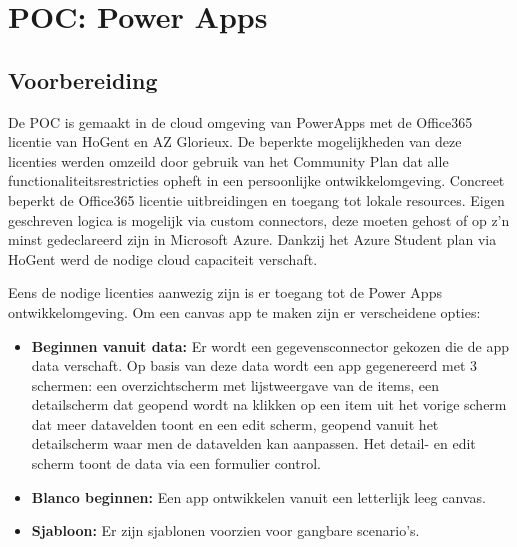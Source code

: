 
\chapter{POC: Power Apps}
\label{ch:powerapps-poc}



\section{Voorbereiding}
\label{sec:voorbereiding-pa}

De POC is gemaakt in de cloud omgeving van PowerApps met de Office365 licentie van HoGent en AZ Glorieux. De beperkte mogelijkheden van deze licenties werden omzeild door gebruik van het Community Plan dat alle functionaliteitsrestricties opheft in een persoonlijke ontwikkelomgeving. Concreet beperkt de Office365 licentie uitbreidingen en toegang tot lokale resources. Eigen geschreven logica is mogelijk via custom connectors, deze moeten gehost of op z'n minst gedeclareerd zijn in Microsoft Azure. Dankzij het Azure Student plan via HoGent werd de nodige cloud capaciteit verschaft.

Eens de nodige licenties aanwezig zijn is er toegang tot de Power Apps ontwikkelomgeving. Om een canvas app te maken zijn er verscheidene opties:
\begin{itemize}
    \item \textbf{Beginnen vanuit data:} Er wordt een gegevensconnector gekozen die de app data verschaft. Op basis van deze data wordt een app gegenereerd met 3 schermen: een overzichtscherm met lijstweergave van de items, een detailscherm dat geopend wordt na klikken op een item uit het vorige scherm dat meer datavelden toont en een edit scherm, geopend vanuit het detailscherm waar men de datavelden kan aanpassen. Het detail- en edit scherm toont de data via een formulier control.
    \item \textbf{Blanco beginnen:} Een app ontwikkelen vanuit een letterlijk leeg canvas.
    \item \textbf{Sjabloon:} Er zijn sjablonen voorzien voor gangbare scenario's.
\end{itemize}


